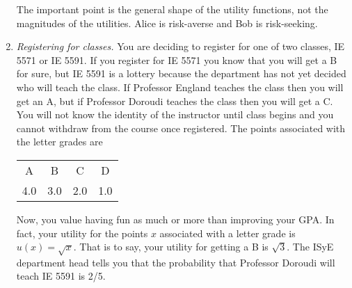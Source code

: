 \begin{enumerate}
\begin{solution}
  \bs The important point is the general shape of the utility
  functions, not the magnitudes of the utilities. Alice is risk-averse
  and Bob is risk-seeking.

\begin{minipage}{.49\textwidth}
\end{minipage}
\hfill
\begin{minipage}{.49\textwidth}
\end{minipage}

\end{solution}

\item \emph{Registering for classes.} You are deciding to register for
  one of two classes, IE 5571 or IE 5591. If you register for IE 5571
  you know that you will get a B for sure, but IE 5591 is a lottery
  because the department has not yet decided who will teach the
  class. If Professor England teaches the class then you will get an
  A, but if Professor Doroudi teaches the class then you will get a
  C. You will not know the identity of the instructor until class
  begins and you cannot withdraw from the course once registered. The
  points associated with the letter grades are

\begingroup
\renewcommand{\arraystretch}{1}
\begin{tabular}{cccc}
A&B&C&D \\
4.0 & 3.0 & 2.0 & 1.0
\end{tabular}
\endgroup

Now, you value having fun as much or more than improving your GPA. In
fact, your utility for the points $x$ associated with a letter grade
is $u(x) = \sqrt{x}$. That is to say, your utility for getting a B is
$\sqrt{3}$. The ISyE department head tells you that the probability
that Professor Doroudi will teach IE 5591 is 2/5.


\end{enumerate}
